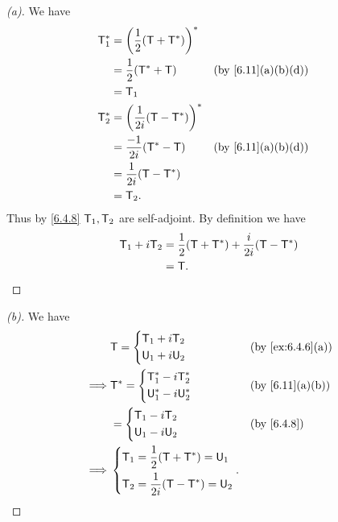 \begin{proof}[(a)]
  We have
  \begin{align*}
    \T_1^* & = \pa{\frac{1}{2} (\T + \T^*)}^*                                        \\
           & = \frac{1}{2} (\T^* + \T)         &  & \text{(by \cref{6.11}(a)(b)(d))} \\
           & = \T_1                                                                  \\
    \T_2^* & = \pa{\frac{1}{2i} (\T - \T^*)}^*                                       \\
           & = \frac{-1}{2i} (\T^* - \T)       &  & \text{(by \cref{6.11}(a)(b)(d))} \\
           & = \frac{1}{2i} (\T - \T^*)                                              \\
           & = \T_2.
  \end{align*}
  Thus by \cref{6.4.8} \(\mathsf{T}_1, \mathsf{T}_2\) are self-adjoint.
  By definition we have
  \begin{align*}
    \mathsf{T}_1 + i \mathsf{T}_2 & = \frac{1}{2} (\mathsf{T} + \mathsf{T}^*) + \frac{i}{2i} (\mathsf{T} - \mathsf{T}^*) \\
                  & = \mathsf{T}.
  \end{align*}
\end{proof}

\begin{proof}[(b)]
  We have
  \begin{align*}
             & \T = \begin{dcases}
                      \T_1 + i \T_2 \\
                      \U_1 + i \U_2
                    \end{dcases}                      &  & \text{(by \cref{ex:6.4.6}(a))} \\
    \implies & \T^* = \begin{dcases}
                        \T_1^* - i \T_2^* \\
                        \U_1^* - i \U_2^*
                      \end{dcases}                    &  & \text{(by \cref{6.11}(a)(b))}  \\
             & = \begin{dcases}
                   \T_1 - i \T_2 \\
                   \U_1 - i \U_2
                 \end{dcases}                         &  & \text{(by \cref{6.4.8})}       \\
    \implies & \begin{dcases}
                 \T_1 = \frac{1}{2} (\T + \T^*) = \U_1 \\
                 \T_2 = \frac{1}{2i} (\T - \T^*) = \U_2
               \end{dcases}.
  \end{align*}
\end{proof}

